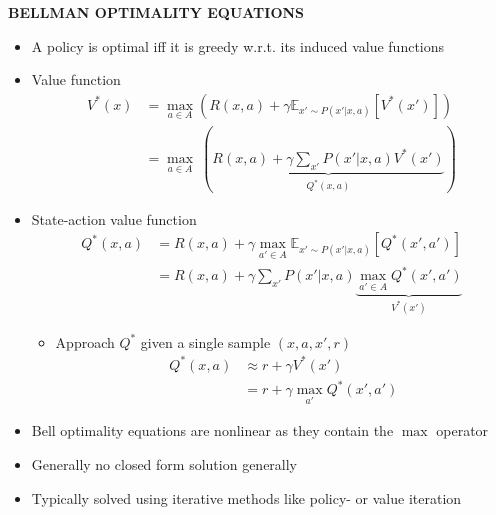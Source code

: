 \begin{whitebox}{\textbf{BELLMAN OPTIMALITY EQUATIONS}}
    \begin{itemize}
        \item A policy is optimal iff it is greedy w.r.t. its induced value functions
        \item Value function
        \begin{align*}
            V^*(x)&=\max_{a\in A}\left(R(x,a)+\gamma\mathbb{E}_{x'\sim P(x'|x,a)}[V^*(x')]\right)\\
            &=\max_{a\in A}\ (\underbrace{R(x,a)+\gamma\sum_{x'}P(x'|x,a)V^*(x')}_{Q^*(x,a)})
        \end{align*}
        \item State-action value function
        \begin{align*}
            Q^*(x,a)&=R(x,a)+\gamma\max_{a'\in A}\mathbb{E}_{x'\sim P(x'|x,a)}[Q^*(x',a')]\\
            &=R(x,a)+\gamma\sum_{x'}P(x'|x,a)\underbrace{\max_{a'\in A}Q^*(x',a')}_{V^*(x')}
        \end{align*}
        \begin{itemize}
            \item Approach $Q^*$ given a single sample $(x,a,x',r)$
            \begin{align*}
                Q^*(x,a)&\approx r+\gamma V^*(x')\\
                &=r+\gamma\max_{a'}Q^*(x',a')
            \end{align*}
        \end{itemize}
        \item Bell optimality equations are nonlinear as they contain the $\max$ operator
        \item Generally no closed form solution generally
        \item Typically solved using iterative methods like policy- or value iteration
    \end{itemize}
\end{whitebox}

